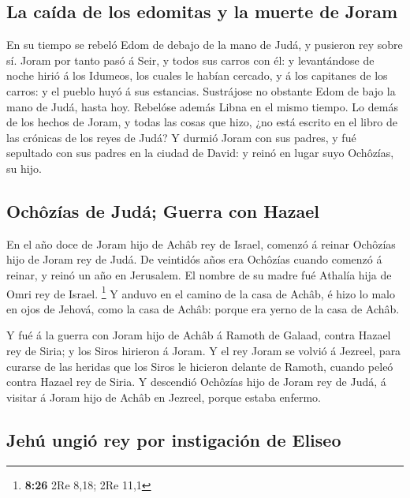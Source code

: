 \hypertarget{la-cauxedda-de-los-edomitas-y-la-muerte-de-joram}{%
\subsection{La caída de los edomitas y la muerte de
Joram}\label{la-cauxedda-de-los-edomitas-y-la-muerte-de-joram}}

 En su tiempo se rebeló Edom de debajo de la mano de Judá,
y pusieron rey sobre sí.  Joram por tanto pasó á Seir, y
todos sus carros con él: y levantándose de noche hirió á los Idumeos,
los cuales le habían cercado, y á los capitanes de los carros: y el
pueblo huyó á sus estancias.  Sustrájose no obstante Edom
de bajo la mano de Judá, hasta hoy. Rebelóse además Libna en el mismo
tiempo.  Lo demás de los hechos de Joram, y todas las cosas
que hizo, ¿no está escrito en el libro de las crónicas de los reyes de
Judá?  Y durmió Joram con sus padres, y fué sepultado con
sus padres en la ciudad de David: y reinó en lugar suyo Ochôzías, su
hijo.

\hypertarget{ochuxf4zuxedas-de-juduxe1-guerra-con-hazael}{%
\subsection{Ochôzías de Judá; Guerra con
Hazael}\label{ochuxf4zuxedas-de-juduxe1-guerra-con-hazael}}

 En el año doce de Joram hijo de Achâb rey de Israel,
comenzó á reinar Ochôzías hijo de Joram rey de Judá.  De
veintidós años era Ochôzías cuando comenzó á reinar, y reinó un año en
Jerusalem. El nombre de su madre fué Athalía hija de Omri rey de Israel.
\footnote{\textbf{8:26} 2Re 8,18; 2Re 11,1}  Y anduvo en el
camino de la casa de Achâb, é hizo lo malo en ojos de Jehová, como la
casa de Achâb: porque era yerno de la casa de Achâb.

 Y fué á la guerra con Joram hijo de Achâb á Ramoth de
Galaad, contra Hazael rey de Siria; y los Siros hirieron á Joram.
 Y el rey Joram se volvió á Jezreel, para curarse de las
heridas que los Siros le hicieron delante de Ramoth, cuando peleó contra
Hazael rey de Siria. Y descendió Ochôzías hijo de Joram rey de Judá, á
visitar á Joram hijo de Achâb en Jezreel, porque estaba enfermo.

\hypertarget{jehuxfa-ungiuxf3-rey-por-instigaciuxf3n-de-eliseo}{%
\subsection{Jehú ungió rey por instigación de
Eliseo}\label{jehuxfa-ungiuxf3-rey-por-instigaciuxf3n-de-eliseo}}


